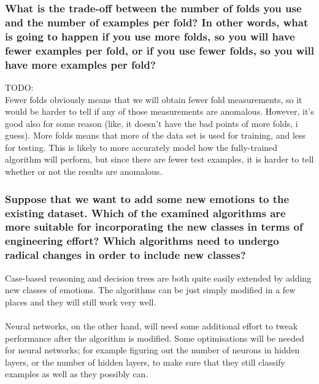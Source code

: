 \documentclass[12pt]{article}
\begin{document}
\subsubsection*{What is the trade-off between the number of folds you use and the number of examples per fold? In other words, what is going to happen if you use more folds, so you will have fewer examples per fold, or if you use fewer folds, so you will have more examples per fold?}

TODO: \\
Fewer folds obviously means that we will obtain fewer fold measurements, so it would be harder to tell if any of those measurements are anomalous. However, it's good also for some reason (like, it doesn't have the bad points of more folds, i guess).
More folds means that more of the data set is used for training, and less for testing. This is likely to more accurately model how the fully-trained algorithm will perform, but since there are fewer test examples, it is harder to tell whether or not the results are anomalous.

\subsubsection*{Suppose that we want to add some new emotions to the existing dataset. Which of the examined algorithms are more suitable for incorporating the new classes in terms of engineering effort? Which algorithms need to undergo radical changes in order to include new classes?}

Case-based reasoning and decision trees are both quite easily extended by adding new classes of emotions. The algorithms can be just simply modified in a few places and they will still work very well.\\ \\
Neural networks, on the other hand, will need some additional effort to tweak performance after the algorithm is modified. Some optimisations will be needed for neural networks; for example figuring out the number of neurons in hidden layers, or the number of hidden layers, to make sure that they still classify examples as well as they possibly can.
\end{document}
